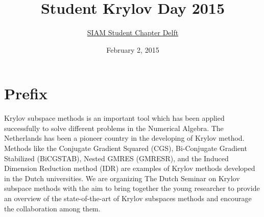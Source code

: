 \documentclass{article}
\title{\bf Student Krylov Day 2015}
\author{\href{http://sscdelft.github.io/activities/2015/02/02/krylov-day.html}{SIAM Student Chapter Delft}}
\date{February 2, 2015}
\begin{document}
\maketitle
\section*{Prefix}
Krylov subspace methods is an important tool which has been applied successfully to solve different problems 
in the Numerical Algebra. The Netherlands has been a pioneer country in the developing of Krylov method.
Methods like the Conjugate Gradient Squared (CGS), Bi-Conjugate Gradient Stabilized (BiCGSTAB), Nested GMRES (GMRESR), and the Induced Dimension Reduction method (IDR)  
are examples of Krylov methods developed in the Dutch universities. 
We are organizing The Dutch Seminar on Krylov subspace methods with the aim 
to bring together the young researcher to provide an
overview of the state-of-the-art of Krylov subspaces methods and encourage 
the collaboration among them.
\newpage
\end{document}
